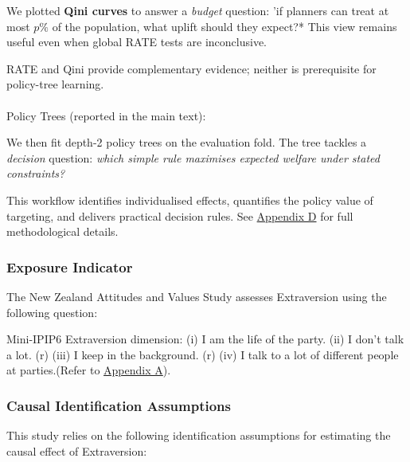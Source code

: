 \documentclass[
  single column]{article}
\makeatletter
\let\oldparagraph\paragraph
\renewcommand{\paragraph}{
    \@ifstar
      \xxxParagraphStar
      \xxxParagraphNoStar
  }
\newcommand{\xxxParagraphStar}[1]{\oldparagraph*{#1}\mbox{}}
\newcommand{\xxxParagraphNoStar}[1]{\oldparagraph{#1}\mbox{}}
\makeatother
\begin{document}
We plotted \textbf{Qini curves} to answer a \emph{budget} question: 'if
planners can treat at most \(p\%\) of the population, what uplift should
they expect?* This view remains useful even when global RATE tests are
inconclusive.

RATE and Qini provide complementary evidence; neither is prerequisite
for policy-tree learning.

\paragraph{Policy Trees (reported in the main
text):}\label{policy-trees-reported-in-the-main-text}

We then fit depth-2 policy trees on the evaluation fold. The tree
tackles a \emph{decision} question: \emph{which simple rule maximises
expected welfare under stated constraints?}

This workflow identifies individualised effects, quantifies the policy
value of targeting, and delivers practical decision rules. See
\hyperref[appendix-explain-grf]{Appendix D} for full methodological
details.

\subsubsection{Exposure Indicator}\label{exposure-indicator}

The New Zealand Attitudes and Values Study assesses Extraversion using
the following question:

Mini-IPIP6 Extraversion dimension: (i) I am the life of the party. (ii)
I don't talk a lot. (r) (iii) I keep in the background. (r) (iv) I talk
to a lot of different people at parties.(Refer to
\hyperref[appendix-measures]{Appendix A}).

\subsubsection{Causal Identification
Assumptions}\label{causal-identification-assumptions}

This study relies on the following identification assumptions for
estimating the causal effect of Extraversion:
\end{document}
